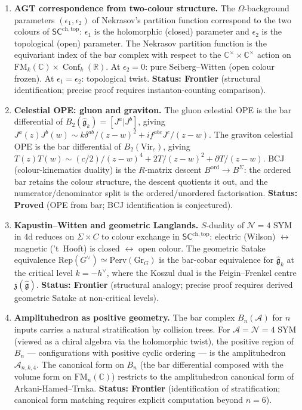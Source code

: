\documentclass[11pt]{article}
\newcommand{\cA}{\mathcal{A}}
\newcommand{\cN}{\mathcal{N}}
\newcommand{\fg}{\mathfrak{g}}
\newcommand{\C}{\mathbb{C}}
\newcommand{\R}{\mathbb{R}}
\newcommand{\SCchtop}{\mathsf{SC}^{\mathrm{ch,top}}}
\newcommand{\FM}{\mathrm{FM}}
\DeclareMathOperator{\Conf}{Conf}
\begin{document}
\begin{enumerate}[label=\textbf{P\arabic*.},leftmargin=2.5em]
\item \textbf{AGT correspondence from two-colour structure.}
The $\Omega$-background parameters $(\epsilon_1, \epsilon_2)$ of
Nekrasov's partition function correspond to the two colours of
$\SCchtop$: $\epsilon_1$ is the holomorphic (closed) parameter
and $\epsilon_2$ is the topological (open) parameter.
The Nekrasov partition function is the equivariant index of the
bar complex with respect to the $\C^\times \times \C^\times$ action
on $\FM_k(\C) \times \Conf_k(\R)$.  At $\epsilon_2 = 0$: pure Seiberg--Witten
(open colour frozen).  At $\epsilon_1 = \epsilon_2$: topological twist.
\textbf{Status: Frontier} (structural identification; precise
proof requires instanton-counting comparison).

\item \textbf{Celestial OPE: gluon and graviton.}
The gluon celestial OPE is the bar differential of
$B_2(\hat{\fg}_k) = [J^a | J^b]$, giving
$J^a(z) J^b(w) \sim k\delta^{ab}/(z-w)^2 + if^{abc}J^c/(z-w)$.
The graviton celestial OPE is the bar differential of
$B_2(\mathrm{Vir}_c)$, giving
$T(z)T(w) \sim (c/2)/(z-w)^4 + 2T/(z-w)^2 + \partial T/(z-w)$.
BCJ (colour-kinematics duality) is the $R$-matrix descent
$B^{\mathrm{ord}} \to B^{\Sigma}$: the ordered bar retains the
colour structure, the descent quotients it out, and the
numerator/denominator split is the ordered/unordered factorisation.
\textbf{Status: Proved} (OPE from bar; BCJ identification is conjectured).

\item \textbf{Kapustin--Witten and geometric Langlands.}
$S$-duality of $\cN = 4$ SYM in $4$d reduces on $\Sigma \times C$
to colour exchange in $\SCchtop$: electric (Wilson) $\leftrightarrow$
magnetic ('t~Hooft) is closed $\leftrightarrow$ open colour.
The geometric Satake equivalence $\mathrm{Rep}(G^\vee) \simeq
\mathrm{Perv}(\mathrm{Gr}_G)$ is the bar-cobar equivalence
for $\hat{\fg}_k$ at the critical level $k = -h^\vee$,
where the Koszul dual is the Feigin--Frenkel centre $\mathfrak{z}(\hat{\fg})$.
\textbf{Status: Frontier} (structural analogy; precise
proof requires derived geometric Satake at non-critical levels).

\item \textbf{Amplituhedron as positive geometry.}
The bar complex $B_n(\cA)$ for $n$ inputs carries a natural
stratification by collision trees.  For $\cA = \cN = 4$ SYM
(viewed as a chiral algebra via the holomorphic twist), the
positive region of $B_n$ --- configurations with positive
cyclic ordering --- is the amplituhedron $\cA_{n,k,4}$.
The canonical form on $B_n$ (the bar differential composed with
the volume form on $\FM_n(\C)$) restricts to the
amplituhedron canonical form of Arkani-Hamed--Trnka.
\textbf{Status: Frontier} (identification of stratification;
canonical form matching requires explicit computation beyond $n = 6$).

\end{enumerate}
\end{document}
